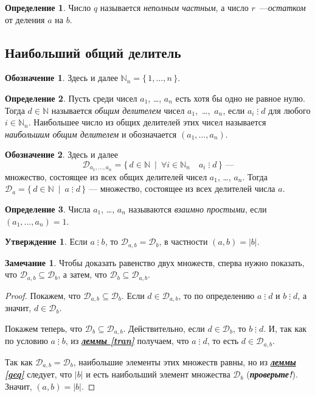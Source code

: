 \documentclass[14pt, a4paper]{extarticle}
\theoremstyle{definition}
\newtheorem*{definition}{Определение}
\newtheorem*{remark}{Замечание}
\newtheorem*{desig}{Обозначение}
\newtheorem{statement}{Утверждение}
\newcommand{\divisible}{\mathop{\vdots}}
\begin{document}
	\begin{definition}
		Число $q$ называется \emph{неполным частным}, а число $r$~---\emph{остатком} от деления $a$ на $b$.
	\end{definition}

\subsection{Наибольший общий делитель}
\label{nod}
	
	\begin{desig}
		Здесь и далее $\mathbb{N}_n=\{\,1,\dots,n\,\}$.
	\end{desig}
	
	\begin{definition}
		Пусть среди чисел $a_1$, \dots, $a_n$ есть хотя бы одно не равное нулю. Тогда $d\in\mathbb{N}$ называется \emph{общим делителем} чисел \mbox{$a_1$, \dots, $a_n$}, если $a_i\divisible d$ для любого $i\in\mathbb{N}_n$. Наибольшее число из общих делителей этих чисел называется \emph{наибольшим общим делителем} и обозначается $(a_1,\dots,a_n)$.
	\end{definition}

	\begin{desig}
		Здесь и далее $$\mathcal{D}_{a_1,\dots,a_n}=\{\,d\in\mathbb{N}\:\mid\:\forall i\in\mathbb{N}_n\quad a_i\divisible d\,\}\text{ ---}$$ множество, состоящее из всех общих делителей чисел $a_1$, \dots, $a_n$. Тогда $\mathcal{D}_a=\{\,d\in\mathbb{N}\:\mid\:a\divisible d\,\}$ --- множество, состоящее из всех делителей числа $a$.
	\end{desig}

	\begin{definition}
		Числа $a_1$, \dots, $a_n$ называются \emph{взаимно простыми}, если $(a_1,\dots,a_n)=1$.
	\end{definition}

	\begin{statement}
	\label{nodab}
		Если $a\divisible b$, то $\mathcal{D}_{a,b}=\mathcal{D}_b$, в частности $(a,b)=|b|$.
	\end{statement}
	\begin{remark}
		Чтобы доказать равенство двух множеств, сперва нужно показать, что $\mathcal{D}_{a,b}\subseteq\mathcal{D}_b$, а затем, что $\mathcal{D}_b\subseteq\mathcal{D}_{a,b}$.
	\end{remark}
	\begin{proof}
		Покажем, что $\mathcal{D}_{a,b}\subseteq\mathcal{D}_b$. Если $d\in\mathcal{D}_{a,b}$, то по определению $a\divisible d$ и $b\divisible d$, а значит, $d\in\mathcal{D}_b$.
		
		Покажем теперь, что $\mathcal{D}_b\subseteq\mathcal{D}_{a,b}$. Действительно, если $d\in\mathcal{D}_b$, то $b\divisible d$. И, так как по условию $a\divisible b$, из \hyperref[tran]{\textbf{\textit{леммы \ref*{tran}}}} получаем, что $a\divisible d$, то есть $d\in\mathcal{D}_{a,b}$.
		
		Так как $\mathcal{D}_{a,b}=\mathcal{D}_b$, наибольшие элементы этих множеств равны, но из \hyperref[geq]{\textbf{\textit{леммы \ref*{geq}}}} следует, что $|b|$ и есть наибольший элемент множества $\mathcal{D}_b$ (\textbf{\textit{проверьте!}}). Значит, $(a,b)=|b|$.
	\end{proof}
\end{document}
